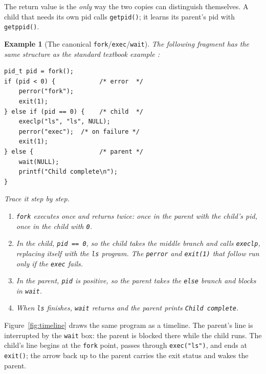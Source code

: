 \documentclass[11pt]{article}
\newtheorem{example}{Example}
\begin{document}
\noindent The return value is the \emph{only} way the two copies can
distinguish themselves. A child that needs its own pid calls \texttt{getpid()};
it learns its parent's pid with \texttt{getppid()}.

\begin{example}[The canonical \texttt{fork}/\texttt{exec}/\texttt{wait}]
\label{ex:canonical}
The following fragment has the same structure as the standard textbook example
\cite{SilberschatzOSC_operating_system_concepts}:
\begin{verbatim}
pid_t pid = fork();
if (pid < 0) {            /* error  */
    perror("fork");
    exit(1);
} else if (pid == 0) {    /* child  */
    execlp("ls", "ls", NULL);
    perror("exec");  /* on failure */
    exit(1);
} else {                  /* parent */
    wait(NULL);
    printf("Child complete\n");
}
\end{verbatim}
Trace it step by step.
\begin{enumerate}
  \item \texttt{fork} executes once and returns twice: once in the parent with
    the child's pid, once in the child with \texttt{0}.
  \item In the child, \texttt{pid == 0}, so the child takes the middle branch
    and calls \texttt{execlp}, replacing itself with the \texttt{ls} program.
    The \texttt{perror} and \texttt{exit(1)} that follow run only if the
    \texttt{exec} fails.
  \item In the parent, \texttt{pid} is positive, so the parent takes the
    \texttt{else} branch and blocks in \texttt{wait}.
  \item When \texttt{ls} finishes, \texttt{wait} returns and the parent prints
    \texttt{Child complete}.
\end{enumerate}
\end{example}

Figure~\ref{fig:timeline} draws the same program as a timeline. The parent's
line is interrupted by the \texttt{wait} box: the parent is blocked there while
the child runs. The child's line begins at the \texttt{fork} point, passes
through \texttt{exec("ls")}, and ends at \texttt{exit()}; the arrow back up to
the parent carries the exit status and wakes the parent.
\end{document}

